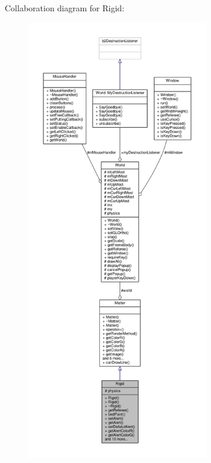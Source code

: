 Collaboration diagram for Rigid\+:\nopagebreak
\begin{figure}[H]
\begin{center}
\leavevmode
\includegraphics[height=550pt]{classRigid__coll__graph}
\end{center}
\end{figure}
